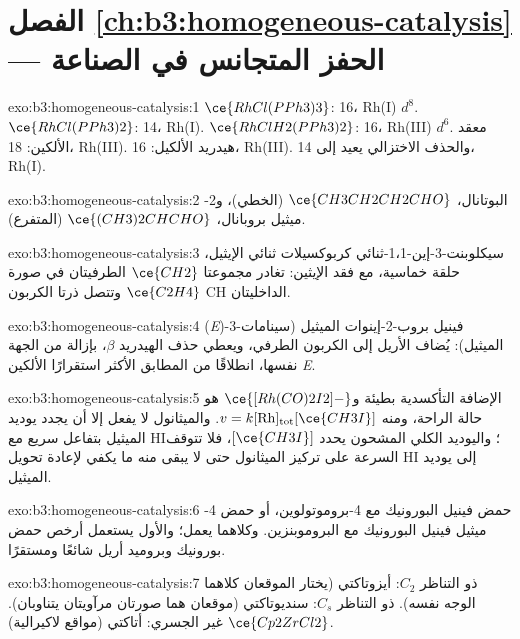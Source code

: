 \section*{الفصل \ref{ch:b3:homogeneous-catalysis} --- الحفز المتجانس في الصناعة}

\begin{solution}{exo:b3:homogeneous-catalysis:1}
$\ce{RhCl(PPh3)3}$: 16، Rh(I) $d^8$. $\ce{RhCl(PPh3)2}$: 14، Rh(I). $\ce{RhClH2(PPh3)2}$: 16، Rh(III) $d^6$.
معقد الألكين: 18، Rh(III). هيدريد الألكيل: 16، Rh(III). والحذف الاختزالي
يعيد إلى 14، Rh(I).
\end{solution}

\begin{solution}{exo:b3:homogeneous-catalysis:2}
البوتانال، $\ce{CH3CH2CH2CHO}$ (الخطي)، و2-ميثيل بروبانال، $\ce{(CH3)2CHCHO}$ (المتفرع).
\end{solution}

\begin{solution}{exo:b3:homogeneous-catalysis:3}
سيكلوبنت-3-إين-1،1-ثنائي كربوكسيلات ثنائي الإيثيل، حلقة خماسية، مع فقد
الإيثين: تغادر مجموعتا $\ce{CH2}$ الطرفيتان في صورة $\ce{C2H4}$ وتتصل ذرتا الكربون CH الداخليتان.
\end{solution}

\begin{solution}{exo:b3:homogeneous-catalysis:4}
(\textit{E})-3-فينيل بروب-2-إينوات الميثيل (سينامات الميثيل): يُضاف الأريل إلى
الكربون الطرفي، ويعطي حذف الهيدريد $\beta$، بإزالة من الجهة نفسها، انطلاقًا من المطابق الأكثر استقرارًا
الألكين \textit{E}.
\end{solution}

\begin{solution}{exo:b3:homogeneous-catalysis:5}
الإضافة التأكسدية بطيئة و$\ce{[Rh(CO)2I2]-}$ هو حالة الراحة، ومنه
$v = k[\mathrm{Rh}]_{\mathrm{tot}}[\ce{CH3I}]$. والميثانول لا يفعل إلا أن يجدد يوديد الميثيل بتفاعل سريع مع HI؛
واليوديد الكلي المشحون يحدد $[\ce{CH3I}]$، فلا تتوقف السرعة على تركيز
الميثانول حتى لا يبقى منه ما يكفي لإعادة تحويل HI إلى
يوديد الميثيل.
\end{solution}

\begin{solution}{exo:b3:homogeneous-catalysis:6}
حمض فينيل البورونيك مع 4-بروموتولوين، أو حمض 4-ميثيل فينيل البورونيك مع
البروموبنزين. وكلاهما يعمل؛ والأول يستعمل أرخص حمض بورونيك وبروميد أريل
شائعًا ومستقرًا.
\end{solution}

\begin{solution}{exo:b3:homogeneous-catalysis:7}
ذو التناظر $C_2$: أيزوتاكتي (يختار الموقعان كلاهما الوجه نفسه). ذو التناظر $C_s$:
سنديوتاكتي (موقعان هما صورتان مرآويتان يتناوبان). $\ce{Cp2ZrCl2}$ غير الجسري: أتاكتي (مواقع
لاكيرالية).
\end{solution}

